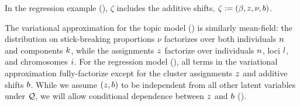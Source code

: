 
\hrulefill

In the regression example (), $\zeta$ includes
the additive shifts, $\zeta := (\beta, z, \nu, b)$.

The variational approximation for the topic model
() is similarly mean-field: the distribution on
stick-breaking proportions $\nu$ factorizes over both individuals $n$ and
components $k$, while the assignments $z$ factorize over individuals $n$,
loci $l$, and chromosomes $i$. For the regression model
(), all terms in the variational approximation
fully-factorize except for the cluster assignments $z$ and additive shifts
$b$. While we assume $(z, b)$ to be independent from all other latent
variables under $\mathcal{Q}$, we will allow conditional dependence between $z$ and $b$
().




\hrulefill


